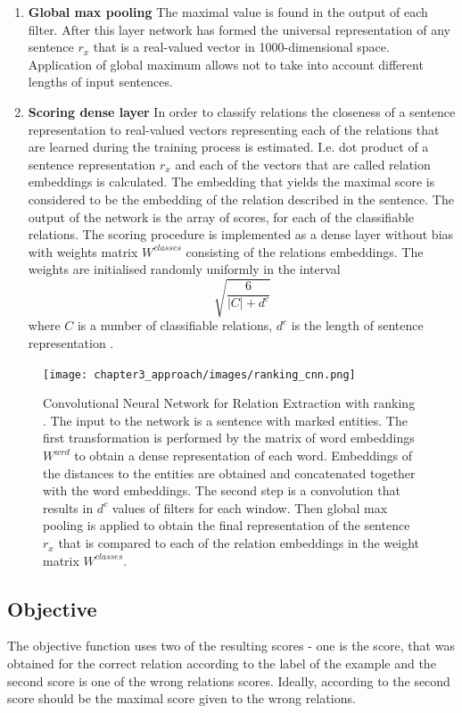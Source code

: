 \begin{enumerate}
  \item \textbf{Global max pooling} The maximal value is found in the output of each filter. After this layer
  network has formed the universal representation of any sentence $r_x$ that is a real-valued vector in 
  1000-dimensional space. Application of global maximum allows not to take into account  
  different lengths of input sentences.
  
  \item \textbf{Scoring dense layer} In order to classify relations the closeness of a sentence 
  representation to real-valued vectors representing each of the relations that are learned during 
  the training process is 
  estimated. I.e. dot product of a sentence representation $r_x$ and each of the
  vectors that are called relation embeddings is calculated. The embedding that yields the maximal score is considered 
  to be the embedding of the relation described in the sentence. The output of the network is the 
  array of scores, for each of the classifiable relations. The scoring procedure is implemented
  as a dense layer without bias with weights matrix $W^{classes}$ consisting of the relations embeddings. The 
  weights are
  initialised randomly uniformly in the interval 
  $$\sqrt{\frac{6}{|C|+d^c}}$$
  where $C$ is a number of classifiable relations, $d^c$ is the length of sentence representation
  \cite{DBLP:journals/corr/SantosXZ15}.
  \end{enumerate}

	\begin{figure}
		\centering
		\texttt{[image: chapter3\_approach/images/ranking\_cnn.png]}
		\caption[Ranking Convolutional Neural Network]{Convolutional Neural Network for Relation Extraction with ranking \cite{DBLP:journals/corr/SantosXZ15}. The input to the network is a sentence with marked entities. The first transformation is performed by the matrix of word embeddings $W^{wrd}$ to obtain a dense representation of each word. Embeddings of the distances to the entities are obtained and concatenated together with the word embeddings. The second step is a convolution that results in $d^c$ values of filters for each window. Then global max pooling is applied to obtain the final representation of the sentence $r_x$ that is compared to each of the relation embeddings in the weight matrix $W^{classes}$.}
		\label{fig:ranking_cnn}
	\end{figure}

\subsection{Objective}
The objective function uses two of the resulting scores - one is the score, that was obtained for the 
correct relation according to the label of the example and the second score is one of the wrong 
relations scores. Ideally, according to \cite{DBLP:journals/corr/SantosXZ15} the second score 
should be the maximal score given to the wrong relations. 

